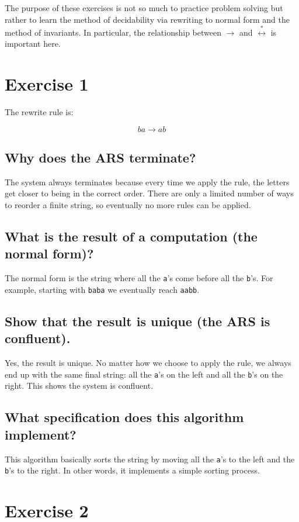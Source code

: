 \documentclass{article}
\theoremstyle{plain}
\theoremstyle{definition}
\theoremstyle{remark}
\begin{document}
The purpose of these exercises is not so much to practice problem solving but rather to learn the method of decidability via rewriting to normal form and the method of invariants. 
In particular, the relationship between $\longrightarrow$ and $\stackrel{\ast}{\longleftrightarrow}$ is important here.

\section{Exercise 1}

The rewrite rule is:

\[
    ba \to ab
\]

\subsection{Why does the ARS terminate?}
The system always terminates because every time we apply the rule, the letters get closer to being in the correct order. There are only a limited number of ways to reorder a finite string, so eventually no more rules can be applied.

\subsection{What is the result of a computation (the normal form)?}
The normal form is the string where all the \texttt{a}'s come before all the \texttt{b}'s. For example, starting with \texttt{baba} we eventually reach \texttt{aabb}.

\subsection{Show that the result is unique (the ARS is confluent).}
Yes, the result is unique. No matter how we choose to apply the rule, we always end up with the same final string: all the \texttt{a}'s on the left and all the \texttt{b}'s on the right. This shows the system is confluent.

\subsection{What specification does this algorithm implement?}
This algorithm basically sorts the string by moving all the \texttt{a}'s to the left and the \texttt{b}'s to the right. In other words, it implements a simple sorting process.

\section{Exercise 2}
\end{document}
